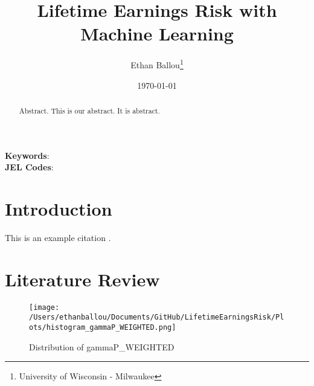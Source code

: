 \documentclass[12pt]{article}
\title{Lifetime Earnings Risk with Machine Learning}
\author{Ethan Ballou\thanks{University of Wisconsin - Milwaukee}}
\date{\today}
\begin{document}
\maketitle
\thispagestyle{empty}



\begin{abstract}
\begin{singlespace}
\noindent 
Abstract.  This is our abstract.  It is abstract.  
\end{singlespace}
\end{abstract}
\noindent
\textbf{Keywords}: \\
\textbf{JEL Codes}: \\






\clearpage
\setcounter{page}{1}





\section{Introduction}

This is an example citation \cite{exampleCitation}. \\ 


\section{Literature Review}




















\begin{figure}[H]
    \centering
    \texttt{[image: /Users/ethanballou/Documents/GitHub/LifetimeEarningsRisk/Plots/histogram\_gammaP\_WEIGHTED.png]}
    \caption{Distribution of gammaP\_WEIGHTED}
\end{figure}
\end{document}
